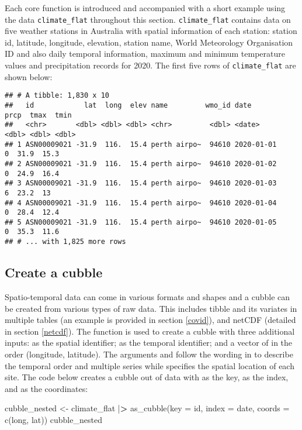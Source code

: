 \documentclass{article}
\newenvironment{Shaded}{\begin{snugshade}}{\end{snugshade}}
\newcommand{\AttributeTok}[1]{\textcolor[rgb]{0.77,0.63,0.00}{#1}}
\newcommand{\ErrorTok}[1]{\textcolor[rgb]{0.64,0.00,0.00}{\textbf{#1}}}
\newcommand{\FunctionTok}[1]{\textcolor[rgb]{0.00,0.00,0.00}{#1}}
\newcommand{\NormalTok}[1]{#1}
\newcommand{\OtherTok}[1]{\textcolor[rgb]{0.56,0.35,0.01}{#1}}
\newcommand{\SpecialCharTok}[1]{\textcolor[rgb]{0.00,0.00,0.00}{#1}}
\begin{document}
Each core  function is introduced and accompanied with a short example using the data \texttt{climate\_flat} throughout this section. \texttt{climate\_flat} contains data on five weather stations in Australia with spatial information of each station: station id, latitude, longitude, elevation, station name, World Meteorology Organisation ID and also daily temporal information, maximum and minimum temperature values and precipitation records for 2020. The first five rows of \texttt{climate\_flat} are shown below:

\begin{verbatim}
## # A tibble: 1,830 x 10
##   id            lat  long  elev name         wmo_id date        prcp  tmax  tmin
##   <chr>       <dbl> <dbl> <dbl> <chr>         <dbl> <date>     <dbl> <dbl> <dbl>
## 1 ASN00009021 -31.9  116.  15.4 perth airpo~  94610 2020-01-01     0  31.9  15.3
## 2 ASN00009021 -31.9  116.  15.4 perth airpo~  94610 2020-01-02     0  24.9  16.4
## 3 ASN00009021 -31.9  116.  15.4 perth airpo~  94610 2020-01-03     6  23.2  13  
## 4 ASN00009021 -31.9  116.  15.4 perth airpo~  94610 2020-01-04     0  28.4  12.4
## 5 ASN00009021 -31.9  116.  15.4 perth airpo~  94610 2020-01-05     0  35.3  11.6
## # ... with 1,825 more rows
\end{verbatim}

\hypertarget{create}{%
\subsection{Create a cubble}\label{create}}

Spatio-temporal data can come in various formats and shapes and a cubble can be created from various types of raw data. This includes tibble and its variates in multiple tables (an example is provided in section \ref{covid}), and netCDF (detailed in section \ref{netcdf}). The function  is used to create a cubble with three additional inputs:  as the spatial identifier;  as the temporal identifier; and a vector of  in the order (longitude, latitude). The arguments  and  follow the wording in  to describe the temporal order and multiple series while  specifies the spatial location of each site. The code below creates a cubble out of  data with  as the key,  as the index, and  as the coordinates:

\begin{Shaded}
\begin{Highlighting}[]
\NormalTok{cubble\_nested }\OtherTok{\textless{}{-}}\NormalTok{ climate\_flat }\SpecialCharTok{|}\ErrorTok{\textgreater{}}
  \FunctionTok{as\_cubble}\NormalTok{(}\AttributeTok{key =}\NormalTok{ id, }\AttributeTok{index =}\NormalTok{ date, }\AttributeTok{coords =} \FunctionTok{c}\NormalTok{(long, lat))}
\NormalTok{cubble\_nested}
\end{Highlighting}
\end{Shaded}
\end{document}
